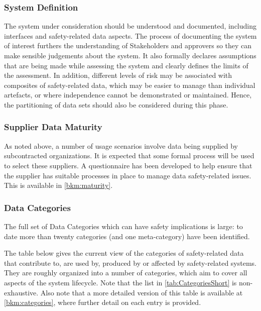 \subsubsection{System Definition}
The system under consideration should be understood and documented, including interfaces and safety-related data aspects. The process of documenting the system of interest furthers the understanding of Stakeholders and approvers so they can make sensible judgements about the system. It also formally declares assumptions that are being made while assessing the system and clearly defines the limits of the assessment. In addition, different levels of risk may be associated with composites of safety-related data, which may be easier to manage than individual artefacts, or where independence cannot be demonstrated or maintained. Hence, the partitioning of data sets should also be considered during this phase.

\subsubsection{Supplier Data Maturity}
As noted above, a number of usage scenarios involve data being supplied by subcontracted organizations. It is expected that some formal process will be used to select these suppliers. A questionnaire has been developed to help ensure that the supplier has suitable processes in place to manage data safety-related issues. This is available in \autoref{bkm:maturity}.

\subsubsection{Data Categories}
\label{bkm:datacategories}
The full set of Data Categories which can have safety implications is large: to date more than twenty categories (and one meta-category) have been identified. 

The table below gives the current view of the categories of safety-related data that contribute to, are used by, produced by or affected by safety-related systems. They are roughly organized into a number of categories, which aim to cover all aspects of the system lifecycle. Note that the list in \autoref{tab:CategoriesShort} is non-exhaustive. Also note that a more detailed version of this table is available at \autoref{bkm:categories},
where further detail on each entry is provided.

